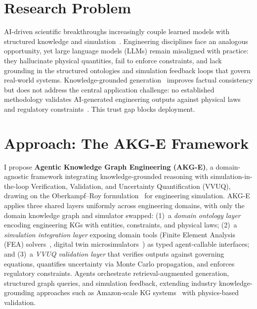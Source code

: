 \documentclass[conference, 10pt]{IEEEtran}
\begin{document}
\section*{Research Problem}

AI-driven scientific breakthroughs increasingly couple learned models with structured knowledge and simulation~\cite{Abramson2024AlphaFold3,Merchant2023GNoME}. Engineering disciplines face an analogous opportunity, yet large language models (LLMs) remain misaligned with practice: they hallucinate physical quantities, fail to enforce constraints, and lack grounding in the structured ontologies and simulation feedback loops that govern real-world systems. Knowledge-grounded generation~\cite{Lewis2020RAG,Edge2024GraphRAG} improves factual consistency but does not address the central application challenge: no established methodology validates AI-generated engineering outputs against physical laws and regulatory constraints~\cite{Oberkampf2010VVUQ}. This trust gap blocks deployment.

\section*{Approach: The AKG-E Framework}

I propose \textbf{Agentic Knowledge Graph Engineering (AKG-E)}, a domain-agnostic framework integrating knowledge-grounded reasoning with simulation-in-the-loop Verification, Validation, and Uncertainty Quantification (VVUQ), drawing on the Oberkampf--Roy formulation~\cite{Oberkampf2010VVUQ} for engineering simulation. AKG-E applies three shared layers uniformly across engineering domains, with only the domain knowledge graph and simulator swapped: (1)~a \textit{domain ontology layer} encoding engineering KGs with entities, constraints, and physical laws; (2)~a \textit{simulation integration layer} exposing domain tools (Finite Element Analysis (FEA) solvers~\cite{Logg2012FEniCS}, digital twin microsimulators~\cite{Tao2019DigitalTwin}) as typed agent-callable interfaces; and (3)~a \textit{VVUQ validation layer} that verifies outputs against governing equations, quantifies uncertainty via Monte Carlo propagation, and enforces regulatory constraints. Agents orchestrate retrieval-augmented generation, structured graph queries, and simulation feedback, extending industry knowledge-grounding approaches such as Amazon-scale KG systems~\cite{Yu2024COSMO} with physics-based validation.
\end{document}

